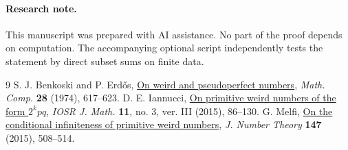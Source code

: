 \documentclass[11pt]{article}
\begin{document}
\paragraph{Research note.} This manuscript was prepared with AI assistance. No part of the proof depends on computation. The accompanying optional script independently tests the statement by direct subset sums on finite data.

\begin{thebibliography}{9}
 S. J. Benkoski and P. Erd\H os, \href{https://doi.org/10.1090/S0025-5718-1974-0347726-9}{On weird and pseudoperfect numbers}, \emph{Math. Comp.} \textbf{28} (1974), 617--623.
 D. E. Iannucci, \href{https://arxiv.org/abs/1504.02761}{On primitive weird numbers of the form \(2^kpq\)}, \emph{IOSR J. Math.} \textbf{11}, no. 3, ver. III (2015), 86--130.
 G. Melfi, \href{https://doi.org/10.1016/j.jnt.2014.07.024}{On the conditional infiniteness of primitive weird numbers}, \emph{J. Number Theory} \textbf{147} (2015), 508--514.
\end{thebibliography}
\end{document}

